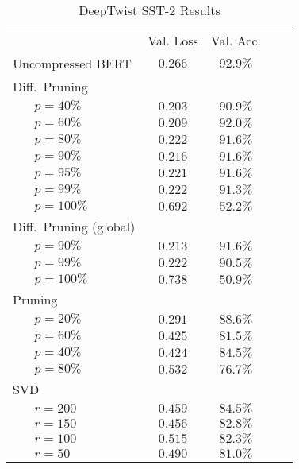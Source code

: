 \newlength{\tableblocksep}
\setlength{\tableblocksep}{1ex}

\begin{table}[tbh]
        \caption{DeepTwist SST-2 Results}
        \label{tab:deeptwistresults}
        \centering
        \vspace{1em}
        \begin{tabular}{p{1ex}lcccc}
\toprule
& &       Val. Loss & Val. Acc. \\
\cmidrule{3-4}
\multicolumn{2}{l}{Uncompressed BERT} & $0.266$ & $92.9\%$ \\[\tableblocksep]
\multicolumn{2}{l}{Diff.\ Pruning} \\
& $p=40\%$  & $0.203$ & $90.9\%$ \\
& $p=60\%$  & $0.209$ & $92.0\%$ \\
& $p=80\%$  & $0.222$ & $91.6\%$ \\
& $p=90\%$  & $0.216$ & $91.6\%$ \\
& $p=95\%$  & $0.221$ & $91.6\%$ \\
& $p=99\%$  & $0.222$ & $91.3\%$ \\
& $p=100\%$ & $0.692$ & $52.2\%$ \\[\tableblocksep]
\multicolumn{2}{l}{Diff.\ Pruning (global)} \\
& $p=90\%$  & $0.213$ & $91.6\%$ \\
& $p=99\%$  & $0.222$ & $90.5\%$ \\
& $p=100\%$ & $0.738$ & $50.9\%$ \\[\tableblocksep]
\multicolumn{2}{l}{Pruning} \\
& $p=20\%$  & $0.291$ & $88.6\%$ \\
& $p=60\%$  & $0.425$ & $81.5\%$ \\
& $p=40\%$  & $0.424$ & $84.5\%$ \\
& $p=80\%$  & $0.532$ & $76.7\%$ \\[\tableblocksep]
\multicolumn{2}{l}{SVD} \\
& $r=200$   & $0.459$ & $84.5\%$ \\
& $r=150$   & $0.456$ & $82.8\%$ \\
& $r=100$   & $0.515$ & $82.3\%$ \\
& $r=50$    & $0.490$ & $81.0\%$ \\[\tableblocksep]
\bottomrule
\end{tabular}

        \end{table}
